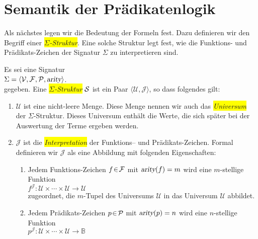 \section{Semantik der Pr\"{a}dikatenlogik}
Als n\"{a}chstes legen wir die Bedeutung der Formeln fest.  Dazu definieren wir 
den Begriff einer \colorbox{yellow}{\emph{$\Sigma$-Struktur}}.  Eine solche Struktur legt fest, wie die
Funktions- und Pr\"{a}dikats-Zeichen der Signatur $\Sigma$ zu interpretieren sind.

\begin{Definition}[Struktur]
    Es sei eine  Signatur \\[0.2cm]
    \hspace*{1.3cm} $\Sigma = \langle \mathcal{V}, \mathcal{F}, \mathcal{P}, \textsl{arity} \rangle$. \\[0.2cm]
    gegeben. Eine \colorbox{yellow}{\emph{$\Sigma$-Struktur}} $\mathcal{S}$ ist ein
    Paar $\langle \mathcal{U}, \mathcal{J} \rangle$, so dass folgendes gilt:
    \begin{enumerate}
        \item $\mathcal{U}$ ist eine nicht-leere Menge. Diese Menge nennen wir auch das
              \colorbox{yellow}{\emph{Universum}} der $\Sigma$-Struktur.  Dieses Universum enth\"{a}lt die Werte,
              die sich sp\"{a}ter bei der Auswertung der Terme ergeben werden.
        \item $\mathcal{J}$ ist die \colorbox{yellow}{\emph{Interpretation}} der Funktions-- und Pr\"{a}dikats-Zeichen.
              Formal definieren wir $\mathcal{J}$ als eine Abbildung mit folgenden Eigenschaften:
        \begin{enumerate}
        \item Jedem Funktions-Zeichen $f \!\in\! \mathcal{F}$ mit $\textsl{arity}(f) = m$ wird
              eine $m$-stellige Funktion \\[0.2cm]
              \hspace*{1.3cm}
              $f^\mathcal{J}\colon \mathcal{U} \times \cdots \times \mathcal{U} \rightarrow \mathcal{U}$ \\[0.2cm]
              zugeordnet, die $m$-Tupel des Universums $\mathcal{U}$ in das Universum $\mathcal{U}$ abbildet.
        \item Jedem Pr\"{a}dikats-Zeichen $p \!\in\! \mathcal{P}$ mit $\textsl{arity}(p) = n$ wird
              eine $n$-stellige Funktion \\[0.2cm]
              \hspace*{1.3cm} 
              $p^\mathcal{J}\colon \mathcal{U} \times \cdots \times \mathcal{U} \rightarrow \mathbb{B}$ \\[0.2cm]

\end{enumerate}
\end{enumerate}
\end{Definition}

